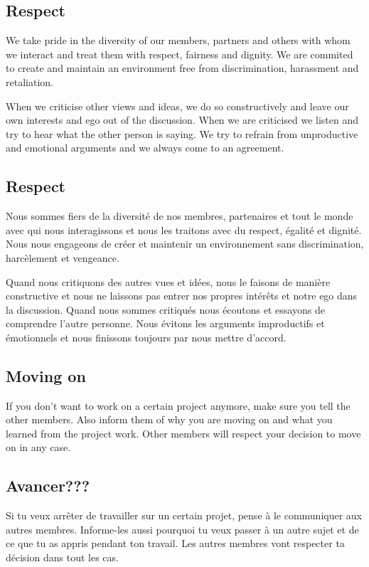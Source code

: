 \english
	\subsection{Respect}
 	We take pride in the diversity of our members, partners and others with whom we interact and treat them with respect, fairness and dignity. We are commited to create and maintain an environment free from discrimination, harassment and retaliation. 

 	When we criticise other views and ideas, we do so constructively and leave our own interests and ego out of the discussion. 
 	When we are criticised we listen and try to hear what the other person is saying. 
 	We try to refrain from unproductive and emotional arguments and we always come to an agreement.


\french
	\subsection{Respect}
	Nous sommes fiers de la diversité de nos membres, partenaires et tout le monde avec qui nous interagissons et nous les traitons avec du respect, égalité et dignité. Nous nous engageons de créer et maintenir un environnement sans discrimination, harcèlement et vengeance. 

	Quand nous critiquons des autres vues et idées, nous le faisons de manière constructive et nous ne laissons pas entrer nos propres intérêts et notre ego dans la discussion.
	Quand nous sommes critiqués nous écoutons et essayons de comprendre l'autre personne. 
	Nous évitons les arguments improductifs et émotionnels et nous finissons toujours par nous mettre d'accord.

\english
	\subsection{Moving on}
	If you don't want to work on a certain project anymore, make sure you tell the other members. Also inform them of why you are moving on and what you learned from the project work. Other members will respect your decision to move on in any case.

\french
	\subsection{Avancer???}
	Si tu veux arrêter de travailler sur un certain projet, pense à le communiquer aux autres membres. Informe-les aussi pourquoi tu veux passer à un autre sujet et de ce que tu as appris pendant ton travail. Les autres membres vont respecter ta décision dans tout les cas.

